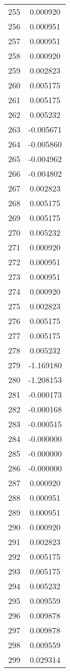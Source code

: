 \documentclass[12pt]{article}
\begin{document}
\begin{longtable}{@{}cc@{}}
255 & 0.000920 \\
256 & 0.000951 \\
257 & 0.000951 \\
258 & 0.000920 \\
259 & 0.002823 \\
260 & 0.005175 \\
261 & 0.005175 \\
262 & 0.005232 \\
263 & -0.005671 \\
264 & -0.005860 \\
265 & -0.004962 \\
266 & -0.004802 \\
267 & 0.002823 \\
268 & 0.005175 \\
269 & 0.005175 \\
270 & 0.005232 \\
271 & 0.000920 \\
272 & 0.000951 \\
273 & 0.000951 \\
274 & 0.000920 \\
275 & 0.002823 \\
276 & 0.005175 \\
277 & 0.005175 \\
278 & 0.005232 \\
279 & -1.169180 \\
280 & -1.208153 \\
281 & -0.000173 \\
282 & -0.000168 \\
283 & -0.000515 \\
284 & -0.000000 \\
285 & -0.000000 \\
286 & -0.000000 \\
287 & 0.000920 \\
288 & 0.000951 \\
289 & 0.000951 \\
290 & 0.000920 \\
291 & 0.002823 \\
292 & 0.005175 \\
293 & 0.005175 \\
294 & 0.005232 \\
295 & 0.009559 \\
296 & 0.009878 \\
297 & 0.009878 \\
298 & 0.009559 \\
299 & 0.029314 \\

\end{longtable}
\end{document}
